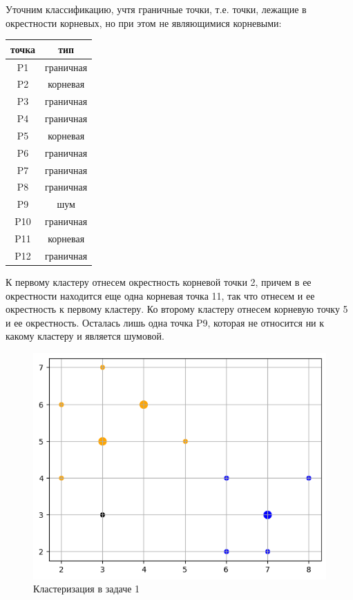 Уточним классификацию, учтя граничные точки, т.е. точки, лежащие в окрестности корневых, но при этом не являющимися корневыми:
\begin{center}
    \begin{tabular}{ |c|c| }
        \hline
        точка & тип       \\\hline
        P1    & граничная \\ 
        P2    & корневая  \\ 
        P3    & граничная \\ 
        P4    & граничная \\
        P5    & корневая  \\
        P6    & граничная \\
        P7    & граничная \\
        P8    & граничная \\
        P9    & шум       \\
        P10   & граничная \\
        P11   & корневая  \\
        P12   & граничная \\
        \hline
    \end{tabular}
\end{center}

К первому кластеру отнесем окрестность корневой точки 2, причем в ее окрестности находится еще одна корневая точка 11, так что отнесем и ее окрестность к первому кластеру. Ко второму кластеру отнесем корневую точку 5 и ее окрестность. Осталась лишь одна точка P9, которая не относится ни к какому кластеру и является шумовой.
\begin{figure}[ht!]
    \centering
    \includegraphics[width=0.7\linewidth]{chapters/clustering/images/task1dbs_plot.png}
    \caption{Кластеризация в задаче 1}
    \label{fig:task1dbs}
\end{figure}

